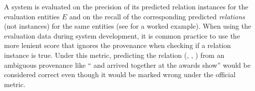 A system is evaluated on the precision of its predicted relation instances for the evaluation entities $E$ and on the recall of the corresponding predicted \textit{relations} (not instances) for the same entities (see  for a worked example).
When using the evaluation data during system development, it is common practice to use the more lenient \anydoc{} score that ignores the provenance when checking if a relation instance is true.
Under this metric, predicting the relation (, , ) from an ambiguous provenance like `` and  arrived together at the awards show'' would be considered correct even though it would be marked wrong under the official metric.




